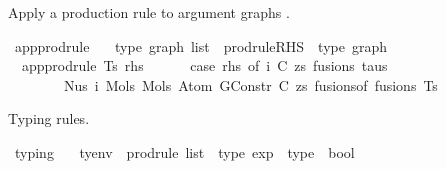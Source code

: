 \begin{isabellebody}
\begin{isamarkuptext}%
Apply a production rule to argument graphs .%
\end{isamarkuptext}\isamarkuptrue%
\isamarkupfalse%
\ app{\isacharunderscore}{\kern0pt}prodrule\ {\isacharcolon}{\kern0pt}{\isacharcolon}{\kern0pt}\isanewline
\ \ {\isachardoublequoteopen}type\ graph\ list\ {\isacharequal}{\kern0pt}{\isachargreater}{\kern0pt}\ prodrule{\isacharunderscore}{\kern0pt}RHS\ {\isacharequal}{\kern0pt}{\isachargreater}{\kern0pt}\ type\ graph{\isachardoublequoteclose}\ \isanewline
\ \ {\isachardoublequoteopen}app{\isacharunderscore}{\kern0pt}prodrule\ Ts\ rhs\ {\isacharequal}{\kern0pt}\isanewline
\ \ \ \ \ {\isacharparenleft}{\kern0pt}case\ rhs\ of\ {\isacharparenleft}{\kern0pt}i{\isacharcomma}{\kern0pt}\ {\isacharparenleft}{\kern0pt}C{\isacharcomma}{\kern0pt}\ zs{\isacharparenright}{\kern0pt}{\isacharcomma}{\kern0pt}\ fusions{\isacharcomma}{\kern0pt}\ taus{\isacharparenright}{\kern0pt}\ {\isacharequal}{\kern0pt}{\isachargreater}{\kern0pt}\isanewline
\ \ \ \ \ \ \ \ Nus{}\ i\ {\isacharparenleft}{\kern0pt}Mols{}\ {\isacharparenleft}{\kern0pt}Mols{}\ {\isacharparenleft}{\kern0pt}Atom\ {\isacharparenleft}{\kern0pt}GConstr\ C{\isacharparenright}{\kern0pt}\ zs{\isacharparenright}{\kern0pt}\ {\isacharparenleft}{\kern0pt}fusions{\isacharunderscore}{\kern0pt}of\ fusions{\isacharparenright}{\kern0pt}{\isacharparenright}{\kern0pt}\ Ts{\isacharparenright}{\kern0pt}{\isacharparenright}{\kern0pt}{\isachardoublequoteclose}%
\begin{isamarkuptext}%
Typing rules.%
\end{isamarkuptext}\isamarkuptrue%
\isamarkupfalse%
\ typing\ {\isacharcolon}{\kern0pt}{\isacharcolon}{\kern0pt}\isanewline
\ \ {\isachardoublequoteopen}tyenv\ {\isacharequal}{\kern0pt}{\isachargreater}{\kern0pt}\ prodrule\ list\ {\isacharequal}{\kern0pt}{\isachargreater}{\kern0pt}\ type\ exp\ {\isacharequal}{\kern0pt}{\isachargreater}{\kern0pt}\ type\ {\isacharequal}{\kern0pt}{\isachargreater}{\kern0pt}\ bool{\isachardoublequoteclose}\isanewline
\ \ {\isacharparenleft}{\kern0pt}{\isacartoucheopen}{\isacharunderscore}{\kern0pt}\ {\isasymturnstile}{\isacharbraceleft}{\kern0pt}{\isacharunderscore}{\kern0pt}{\isacharbraceright}{\kern0pt}\ {\isacharunderscore}{\kern0pt}\ {\isacharcolon}{\kern0pt}\ {\isacharunderscore}{\kern0pt}{\isacartoucheclose}\ {\isacharbrackleft}{\kern0pt}{}{}{\isacharcomma}{\kern0pt}\ {}{}{\isacharcomma}{\kern0pt}\ {}{}{\isacharcomma}{\kern0pt}\ {}{}{\isacharbrackright}{\kern0pt}\ {}{}{\isacharparenright}{\kern0pt}\isanewline

\end{isabellebody}

